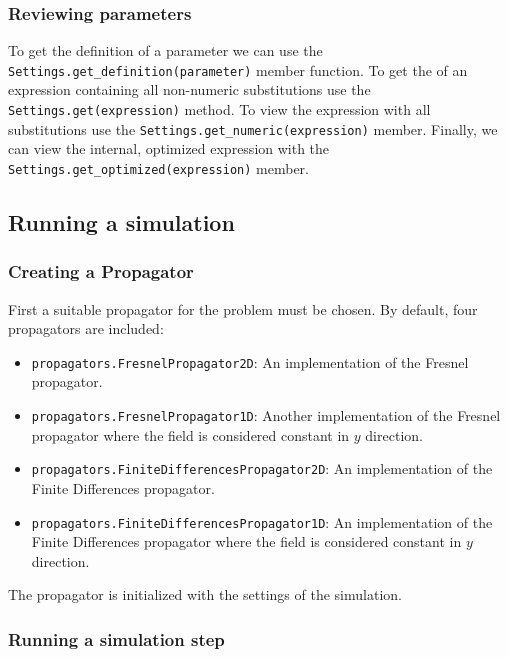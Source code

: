 \subsubsection{Reviewing parameters}

To get the definition of a parameter we can use the \lstinline{Settings.get_definition(parameter)} member function. To get the of an expression containing all non-numeric substitutions use the \lstinline{Settings.get(expression)} method. To view the expression with all substitutions use the  \lstinline{Settings.get_numeric(expression)} member. Finally, we can view the internal, optimized expression with the \lstinline{Settings.get_optimized(expression)} member.


\subsection{Running a simulation}

\subsubsection{Creating a Propagator}

First a suitable propagator for the problem must be chosen. By default, four propagators are included:

\begin{itemize}
    \item \lstinline{propagators.FresnelPropagator2D}: An implementation of the Fresnel propagator.
    \item \lstinline{propagators.FresnelPropagator1D}: Another implementation of the Fresnel propagator where the field is considered constant in $y$ direction.
    \item \lstinline{propagators.FiniteDifferencesPropagator2D}: An implementation of the Finite Differences propagator.
    \item \lstinline{propagators.FiniteDifferencesPropagator1D}: An implementation of the Finite Differences propagator  where the field is considered constant in $y$ direction.

\end{itemize}

The propagator is initialized with the settings of the simulation.

\subsubsection{Running a simulation step}

